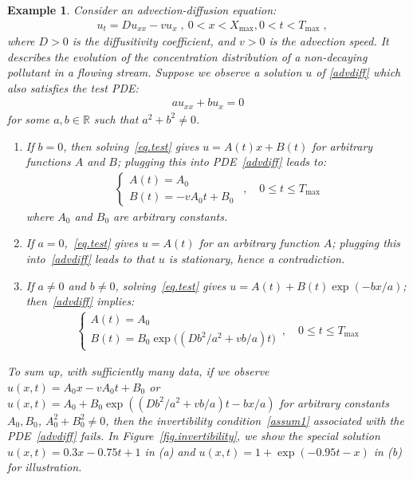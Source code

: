 \documentclass[a4paper,11pt]{article}
\newtheorem{example}{Example}[section]
\begin{document}
\begin{example}
Consider an advection-diffusion equation:
\begin{align}
&u_t=Du_{xx}-vu_x\;,~0<x<X_{\max},0<t<T_{\max}\;,\label{advdiff}
\end{align}
where $D>0$ is the diffusitivity coefficient, and $v>0$ is the advection speed. It describes the evolution of the concentration distribution of a non-decaying pollutant in a flowing stream. Suppose we observe a solution $u$ of \eqref{advdiff} which also satisfies the test PDE:
\begin{align}
au_{xx}+bu_{x}=0\label{eq.test}	
\end{align}
for some $a,b\in\mathbb{R}$ such that $a^2+b^2\neq 0$.
\begin{enumerate}
\item If $b= 0$, then solving~\eqref{eq.test} gives $u=A(t)x+B(t)$ for arbitrary functions $A$ and $B$; plugging this into PDE~\eqref{advdiff} leads to:
\begin{align}
\begin{cases}
A(t)=A_0\\
B(t) = -vA_0t+B_0\;
\end{cases}\,,\quad 0\leq t\leq T_{\max}
\end{align}
where $A_0$ and $B_0$ are arbitrary constants.
\item If $a=0$,~\eqref{eq.test} gives $u=A(t)$ for an arbitrary function $A$; plugging this into~\eqref{advdiff} leads to  that $u$ is stationary, hence a contradiction.
\item If $a\neq0$ and $b\neq 0$,  solving~\eqref{eq.test} gives $u=A(t)+B(t)\exp(-bx/a)$; then~\eqref{advdiff} implies:
\begin{align}
\begin{cases}
A(t)=A_0\\
B(t)=B_0\exp\big((Db^2/a^2+vb/a)t\big)
\end{cases}\,,\quad 0\leq t\leq T_{\max}\label{test3}	
\end{align}
\end{enumerate}
To sum up, with sufficiently many data, if we observe $u(x,t)=A_0x-vA_0t+B_0$ or $u(x,t)=A_0+B_0\exp((Db^2/a^2+vb/a)t-bx/a)$ for arbitrary constants $A_0,B_0$, $A_0^2+B_0^2\neq 0$, then the invertibility condition~\eqref{assum1} associated with the PDE~\eqref{advdiff} fails. In Figure~\ref{fig.invertibility}, we show the special solution $u(x,t)=0.3x-0.75t+1$ in (a) and $u(x,t)=1+\exp(-0.95t-x)$ in (b) for illustration.
\end{example}
\end{document}
